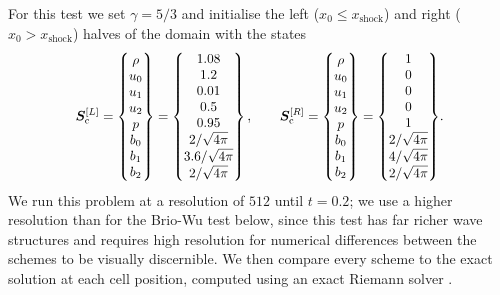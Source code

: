 For this test we set $\gamma=5/3$ and initialise the left ($x_0 \leq x_\mathrm{shock}$) and right ($x_0 > x_\mathrm{shock}$) halves of the domain with the states
\begin{align}
\scalebox{0.95}{$\displaystyle
    \mVector{S}_\mathrm{c}^{[L]}
        = \begin{Bmatrix}
                \rho \\
                u_0 \\
                u_1 \\
                u_2 \\
                p \\
                b_0 \\
                b_1 \\
                b_2
            \end{Bmatrix}
        = \begin{Bmatrix}
                1.08 \\
                1.2 \\
                0.01 \\
                0.5 \\
                0.95 \\
                2/\sqrt{4\pi} \\
                3.6/\sqrt{4\pi} \\
                2/\sqrt{4\pi}
            \end{Bmatrix}
    , \qquad
    \mVector{S}_\mathrm{c}^{[R]}
        = \begin{Bmatrix}
                \rho \\
                u_0 \\
                u_1 \\
                u_2 \\
                p \\
                b_0 \\
                b_1 \\
                b_2
            \end{Bmatrix}
        = \begin{Bmatrix}
                1 \\
                0 \\
                0 \\
                0 \\
                1 \\
                2/\sqrt{4\pi} \\
                4/\sqrt{4\pi} \\
                2/\sqrt{4\pi}
            \end{Bmatrix}
$}
    .
\end{align}
We run this problem at a resolution of $512$ until $t=0.2$; we use a higher resolution than for the Brio-Wu test below, since this test has far richer wave structures and requires high resolution for numerical differences between the schemes to be visually discernible. We then compare every scheme to the exact solution at each cell position, computed using an exact Riemann solver \citep{Kriel26a}.

